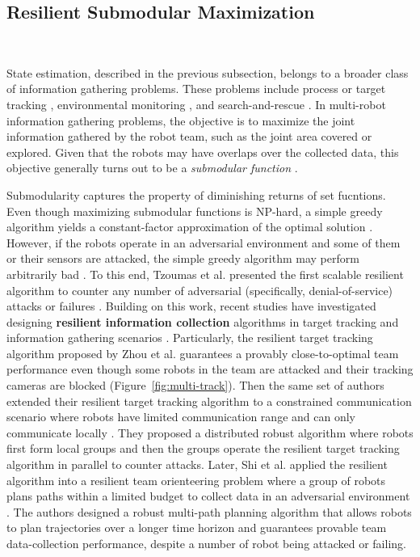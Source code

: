 \subsection{Resilient Submodular Maximization}~\label{subsec:resi_submodular}

State estimation, described in the previous subsection, belongs to a broader class of information gathering problems. These problems include process or target tracking \cite{tokekar2014multi,atanasov2014information,zhou2017active,zhou2018active,zhou2019sensor}, environmental monitoring \cite{michini2014robotic}, and search-and-rescue \cite{kumar2012opportunities}. In multi-robot information gathering problems, the objective is to maximize the joint information gathered by the robot team, such as the joint area covered or explored. Given that the robots may have overlaps over the collected data, this objective generally turns out to be a \textit{submodular function} \cite{nemhauser1978analysis,fisher1978analysis}. 

Submodularity captures the property of
diminishing returns of set fucntions. Even though maximizing submodular functions is NP-hard, a simple greedy algorithm yields a constant-factor approximation of the optimal solution \cite{nemhauser1978analysis,fisher1978analysis}. However, if the robots operate in an adversarial environment and some of them or their sensors are attacked, the simple greedy algorithm may perform arbitrarily bad \cite{zhou2018resilient}. To this end, Tzoumas et al. presented the first scalable resilient algorithm to counter any number of adversarial (specifically, denial-of-service) attacks or failures \cite{tzoumas2017resilient}. Building on this work, recent studies have investigated designing \textbf{resilient information collection} algorithms in target tracking \cite{zhou2018resilient} and information gathering scenarios \cite{schlotfeldt2018resilient}. Particularly, the resilient target tracking algorithm proposed by Zhou et al. \cite{zhou2018resilient} guarantees a provably close-to-optimal team performance even though some robots in the team are attacked and their tracking cameras are blocked (Figure~\ref{fig:multi-track}). Then the same set of authors extended their resilient target tracking algorithm to a constrained communication scenario where robots have limited communication range and can only communicate locally \cite{zhou2019distributed}. They proposed a distributed robust algorithm where robots first form local groups and then the groups operate the resilient target tracking algorithm \cite{zhou2018resilient} in parallel to counter attacks. Later, Shi et al. applied the resilient algorithm \cite{tzoumas2017resilient} into a resilient team orienteering problem where a group of robots plans paths within a limited budget to collect data in an adversarial environment \cite{shi2020robust}. The authors designed a robust multi-path planning algorithm that allows robots to plan trajectories over a longer time horizon and guarantees provable team data-collection performance, despite a number of robot being attacked or failing.  


